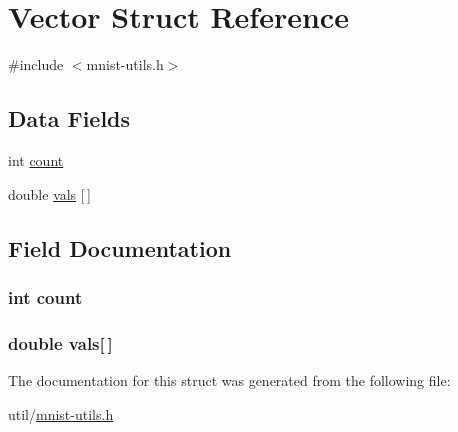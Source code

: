 \hypertarget{struct_vector}{}\section{Vector Struct Reference}
\label{struct_vector}


{\ttfamily \#include $<$mnist-\/utils.\+h$>$}

\subsection*{Data Fields}
\begin{DoxyCompactItemize}
\item 
int \hyperlink{struct_vector_ad43c3812e6d13e0518d9f8b8f463ffcf}{count}
\item 
double \hyperlink{struct_vector_a054a41f1999deb3c70763b34817c859c}{vals} \mbox{[}$\,$\mbox{]}
\end{DoxyCompactItemize}


\subsection{Field Documentation}
\hypertarget{struct_vector_ad43c3812e6d13e0518d9f8b8f463ffcf}{}
\subsubsection[{count}]{\setlength{\rightskip}{0pt plus 5cm}int count}\label{struct_vector_ad43c3812e6d13e0518d9f8b8f463ffcf}
\hypertarget{struct_vector_a054a41f1999deb3c70763b34817c859c}{}
\subsubsection[{vals}]{\setlength{\rightskip}{0pt plus 5cm}double vals\mbox{[}$\,$\mbox{]}}\label{struct_vector_a054a41f1999deb3c70763b34817c859c}


The documentation for this struct was generated from the following file\+:\begin{DoxyCompactItemize}
\item 
util/\hyperlink{mnist-utils_8h}{mnist-\/utils.\+h}\end{DoxyCompactItemize}
